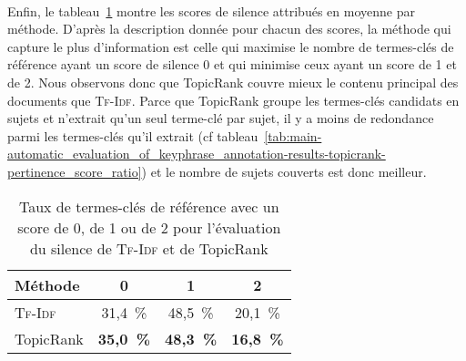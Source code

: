         ~\\Enfin, le
        tableau~\ref{tab:main-automatic_evaluation_of_keyphrase_annotation-results-topicrank-silence_score_ratio}
        montre les scores de silence attribués en moyenne par méthode. D'après
        la description donnée pour chacun des scores, la méthode qui capture le
        plus d'information est celle qui maximise le nombre de termes-clés de
        référence ayant un score de silence 0 et qui minimise ceux ayant un
        score de 1 et de 2. Nous observons donc que TopicRank couvre mieux le
        contenu principal des documents que \textsc{Tf-Idf}. Parce que TopicRank
        groupe les termes-clés candidats en sujets et n'extrait qu'un seul
        terme-clé par sujet, il y a moins de redondance parmi les termes-clés
        qu'il extrait (cf
        tableau~\ref{tab:main-automatic_evaluation_of_keyphrase_annotation-results-topicrank-pertinence_score_ratio})
        et le nombre de sujets couverts est donc meilleur.
        \begin{table}[h!]
          \centering
          \begin{tabular}{l|c|c|c}
            \toprule
            \textbf{Méthode} & \textbf{0} & \textbf{1} & \textbf{2}\\
            \hline
            \textsc{Tf-Idf} & 31,4~\% & 48,5~\% & 20,1~\%\\
            TopicRank & \textbf{35,0~\%} & \textbf{48,3~\%} & \textbf{16,8~\%}\\
            \bottomrule
          \end{tabular}
          \caption{Taux de termes-clés de référence avec un score de 0, de 1 ou
                   de 2 pour l'évaluation du silence de \textsc{Tf-Idf} et de
                   TopicRank
                   \label{tab:main-automatic_evaluation_of_keyphrase_annotation-results-topicrank-silence_score_ratio}}
        \end{table}


